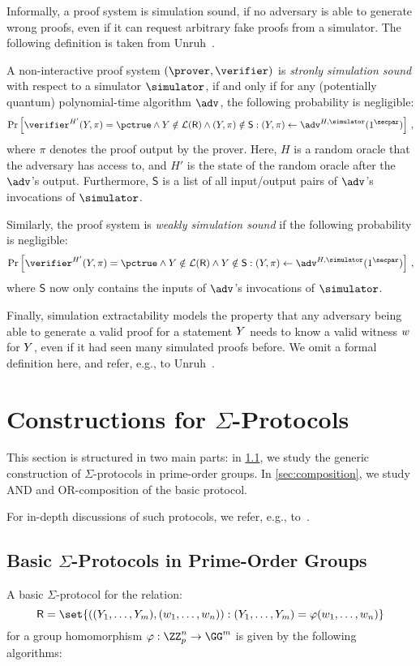 \documentclass[runningheads]{llncs}
\begin{document}
Informally, a proof system is simulation sound, if no adversary is able to generate wrong proofs, even if it can request arbitrary fake proofs from a simulator.
The following definition is taken from Unruh~\cite{AC:Unruh17}.
\begin{definition}[Informal]
  A non-interactive proof system $(\prover,\verifier)$ is \emph{stronly simulation sound} with respect to a simulator $\simulator$, if and only if for any (potentially quantum) polynomial-time algorithm $\adv$, the following probability is negligible:
  $$
    \Pr\left[\verifier^{H'}(\statement,\pi)=\accept\land\statement\notin\lang(\relation)\land(\statement,\pi)\notin\mathsf{S} : (\statement,\pi)\gets\adv^{H,\simulator}(1^\secpar) \right]\,,
  $$
  where $\pi$ denotes the proof output by the prover.
  Here, $H$ is a random oracle that the adversary has access to, and $H'$ is the state of the random oracle after the $\adv$'s output.
  Furthermore, $\mathsf{S}$ is a list of all input/output pairs of $\adv$'s invocations of $\simulator$.

  Similarly, the proof system is \emph{weakly simulation sound} if the following probability is negligible:
  $$
    \Pr\left[\verifier^{H'}(\statement,\pi)=\accept\land\statement\notin\lang(\relation)\land\statement\notin\mathsf{S} : (\statement,\pi)\gets\adv^{H,\simulator}(1^\secpar) \right]\,,
  $$
  where $\mathsf{S}$ now only contains the inputs of $\adv$'s invocations of $\simulator$.
\end{definition}

Finally, simulation extractability models the property that any adversary being able to generate a valid proof for a statement $Y$ needs to know a valid witness $w$ for $Y$, even if it had seen many simulated proofs before.
We omit a formal definition here, and refer, e.g., to Unruh~\cite{AC:Unruh17}.


\section{Constructions for $\Sigma$-Protocols}

This section is structured in two main parts: in \cref{sec:basicsigma}, we study the generic construction of $\Sigma$-protocols in prime-order groups. In \cref{sec:composition}, we study AND and OR-composition of the basic protocol.

For in-depth discussions of such protocols, we refer, e.g., to~\cite{bangerter05,AFRICACRYPT:Maurer09,DBLP:journals/dcc/Maurer15}.
\subsection{Basic $\Sigma$-Protocols in Prime-Order Groups}\label{sec:basicsigma}
A basic $\Sigma$-protocol for the relation:
\[
  \relation=\set{((\statement_1,\dots,\statement_m),(w_1,\dots,w_n)) : (\statement_1,\dots,\statement_m)=\varphi(w_1,\dots,w_n)}
\]
 for a group homomorphism $\varphi:\ZZ_p^n\to\GG^m$ is given by the following algorithms:
\end{document}
